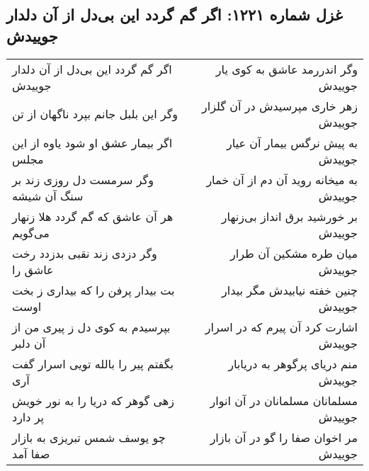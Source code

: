 \begin{center}
\section*{غزل شماره ۱۲۲۱: اگر گم گردد این بی‌دل از آن دلدار جوییدش}
\label{sec:1221}
\begin{longtable}{l p{0.5cm} r}
اگر گم گردد این بی‌دل از آن دلدار جوییدش
&&
وگر اندررمد عاشق به کوی یار جوییدش
\\
وگر این بلبل جانم بپرد ناگهان از تن
&&
زهر خاری مپرسیدش در آن گلزار جوییدش
\\
اگر بیمار عشق او شود یاوه از این مجلس
&&
به پیش نرگس بیمار آن عیار جوییدش
\\
وگر سرمست دل روزی زند بر سنگ آن شیشه
&&
به میخانه روید آن دم از آن خمار جوییدش
\\
هر آن عاشق که گم گردد هلا زنهار می‌گویم
&&
بر خورشید برق انداز بی‌زنهار جوییدش
\\
وگر دزدی زند نقبی بدزدد رخت عاشق را
&&
میان طره مشکین آن طرار جوییدش
\\
بت بیدار پرفن را که بیداری ز بخت اوست
&&
چنین خفته نیابیدش مگر بیدار جوییدش
\\
بپرسیدم به کوی دل ز پیری من از آن دلبر
&&
اشارت کرد آن پیرم که در اسرار جوییدش
\\
بگفتم پیر را بالله تویی اسرار گفت آری
&&
منم دریای پرگوهر به دریابار جوییدش
\\
زهی گوهر که دریا را به نور خویش پر دارد
&&
مسلمانان مسلمانان در آن انوار جوییدش
\\
چو یوسف شمس تبریزی به بازار صفا آمد
&&
مر اخوان صفا را گو در آن بازار جوییدش
\\
\end{longtable}
\end{center}
